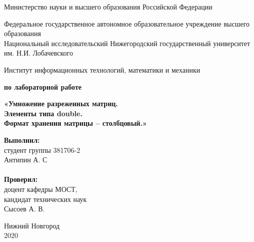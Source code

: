 \documentclass{report}
\begin{document}
\begin{titlepage}

\begin{center}
Министерство науки и высшего образования Российской Федерации
\end{center}

\begin{center}
Федеральное государственное автономное образовательное учреждение высшего образования \\
Национальный исследовательский Нижегородский государственный университет им. Н.И. Лобачевского
\end{center}

\begin{center}
Институт информационных технологий, математики и механики
\end{center}

\vspace{4em}

\begin{center}
\textbf{ по лабораторной работе} \\
\end{center}
\begin{center}
\textbf{\Large«Умножение разреженных матриц.\\Элементы типа double.\\Формат хранения матрицы – столбцовый.»} \\
\end{center}

\vspace{4em}

\newbox{\lbox}
\newlength{\maxl}
\setlength{\maxl}{\wd\lbox}
\hfill\parbox{7cm}{
\hspace*{5cm}\hspace*{-5cm}\textbf{Выполнил:} \\ студент группы 381706-2 \\ Антипин А. С\\
\\
\hspace*{5cm}\hspace*{-5cm}\textbf{Проверил:}\\ доцент кафедры МОСТ, \\ кандидат технических наук \\ Сысоев А. В.
}

\vspace{\fill}

\begin{center} Нижний Новгород \\ 2020 \end{center}

\end{titlepage}
\end{document}
